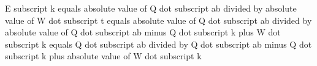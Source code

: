 E subscript k equals absolute value of Q dot subscript ab divided by absolute value of W dot subscript t equals absolute value of Q dot subscript ab divided by absolute value of Q dot subscript ab minus Q dot subscript k plus W dot subscript k equals Q dot subscript ab divided by Q dot subscript ab minus Q dot subscript k plus absolute value of W dot subscript k